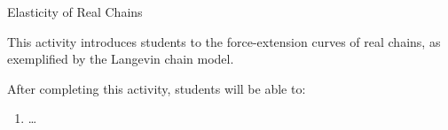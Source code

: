 %
%
%
%

\renewcommand{\figpath}{content/polymphys/chain-confs/langevin-chains/figs}
\renewcommand{\labelbase}{langevin-chains}

\begin{activity}[extension]{Elasticity of Real Chains}
\label{\labelbase}

\begin{instructornotes}

	This activity introduces students to the force-extension curves of real chains, as exemplified by the Langevin chain model.
	
	After completing this activity, students will be able to:
			\begin{enumerate}
				\item \dots
			\end{enumerate}
	
			

\end{instructornotes}
\end{activity}
